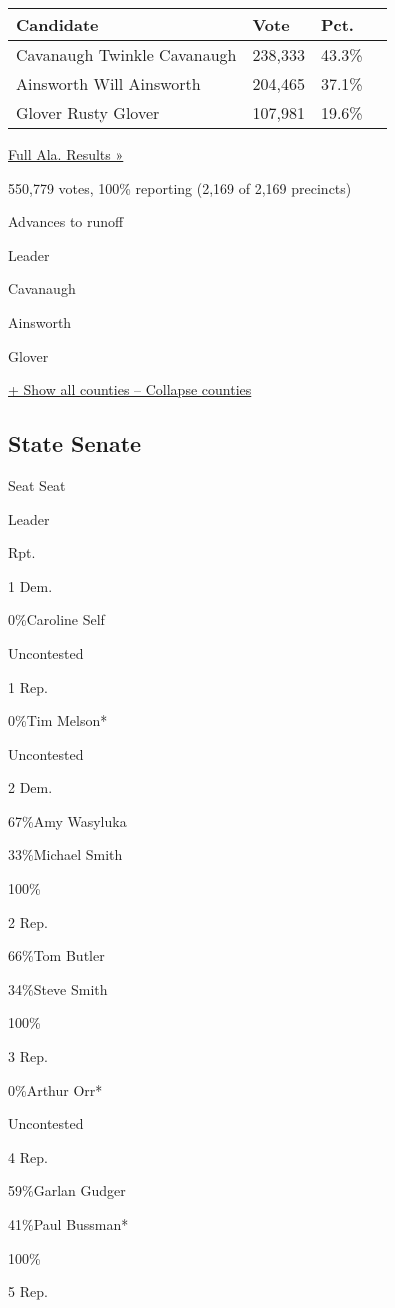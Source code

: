 \begin{longtable}[]{@{}llll@{}}
\toprule
Candidate & Vote & Pct. &\tabularnewline
\midrule
\endhead
 Cavanaugh Twinkle Cavanaugh & 238,333 & 43.3\% &\tabularnewline
 Ainsworth Will Ainsworth & 204,465 & 37.1\% &\tabularnewline
 Glover Rusty Glover & 107,981 & 19.6\% &\tabularnewline
\bottomrule
\end{longtable}

\href{https://www.nytimes3xbfgragh.onion/elections/results/alabama}{Full
Ala. Results »}

550,779 votes, 100\% reporting (2,169 of 2,169 precincts)

 Advances to runoff

Leader

 Cavanaugh

 Ainsworth

 Glover

\protect\hyperlink{}{+ Show all counties -- Collapse counties}

\hypertarget{state-senate}{%
\subsection{State Senate}\label{state-senate}}

Seat Seat

Leader

Rpt.

1 Dem.

 0\%Caroline Self

Uncontested

1 Rep.

 0\%Tim Melson*

Uncontested

2 Dem.

 67\%Amy Wasyluka

 33\%Michael Smith

100\%

2 Rep.

 66\%Tom Butler

 34\%Steve Smith

100\%

3 Rep.

 0\%Arthur Orr*

Uncontested

4 Rep.

 59\%Garlan Gudger

 41\%Paul Bussman*

100\%

5 Rep.


